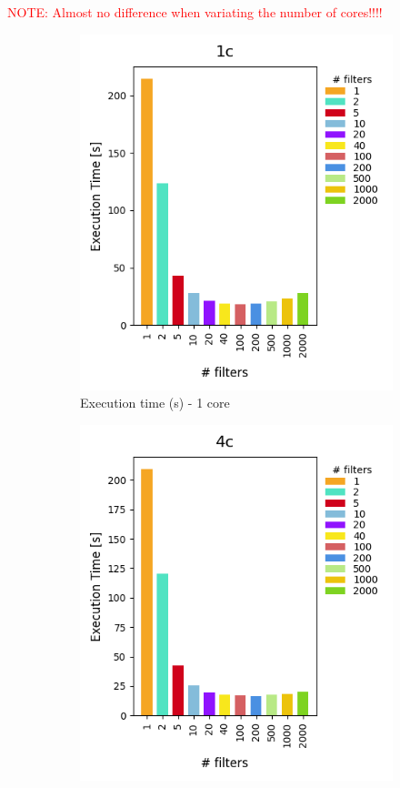 \textcolor{red}{NOTE: Almost no difference when variating the number of cores!!!!}

\begin{figure}[H]
  \centering
  \begin{subfigure}[b]{0.45\textwidth}
    \centering
    \includegraphics[scale=0.6]{images/4-Experiments/E2/fixedcores/1c/execTime.png}
    \caption{Execution time (s) - 1 core}
  \end{subfigure}
  \hfill
  \begin{subfigure}[b]{0.45\textwidth}
    \centering
    \includegraphics[scale=0.6]{images/4-Experiments/E2/fixedcores/4c/execTime.png}

\end{subfigure}
\end{figure}
